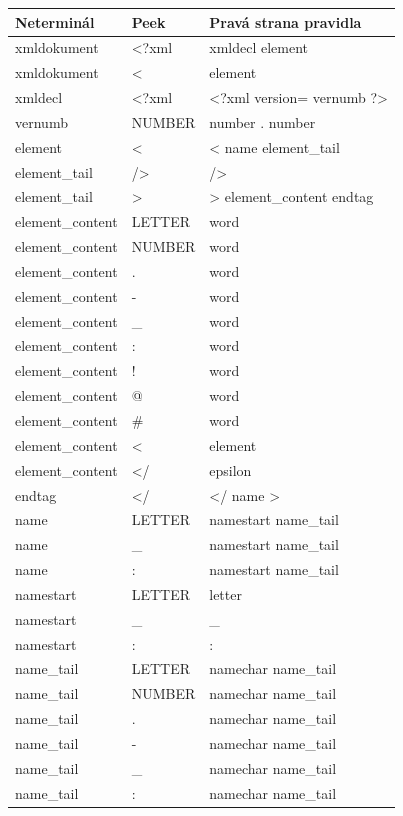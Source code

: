 \documentclass[12pt,a4paper]{article}
\begin{document}
\begin{longtable}{>{\ttfamily}p{}>{\ttfamily}p{}>{\ttfamily}p{}}
\toprule
\normalfont Neterminál & \normalfont Peek & \normalfont Pravá strana pravidla \\
\midrule
\endhead
xmldokument & <?xml & xmldecl element \\
xmldokument & < & element \\
xmldecl & <?xml & <?xml version= vernumb ?> \\
vernumb & NUMBER & number . number \\
element & < & < name element\_tail \\
element\_tail & /> & /> \\
element\_tail & > & > element\_content endtag \\
element\_content & LETTER & word \\
element\_content & NUMBER & word \\
element\_content & . & word \\
element\_content & - & word \\
element\_content & \_ & word \\
element\_content & : & word \\
element\_content & ! & word \\
element\_content & @ & word \\
element\_content & \# & word \\
element\_content & < & element \\
element\_content & </ & epsilon \\
endtag & </ & </ name > \\
name & LETTER & namestart name\_tail \\
name & \_ & namestart name\_tail \\
name & : & namestart name\_tail \\
namestart & LETTER & letter \\
namestart & \_ & \_ \\
namestart & : & : \\
name\_tail & LETTER & namechar name\_tail \\
name\_tail & NUMBER & namechar name\_tail \\
name\_tail & . & namechar name\_tail \\
name\_tail & - & namechar name\_tail \\
name\_tail & \_ & namechar name\_tail \\
name\_tail & : & namechar name\_tail \\

\end{longtable}
\end{document}
